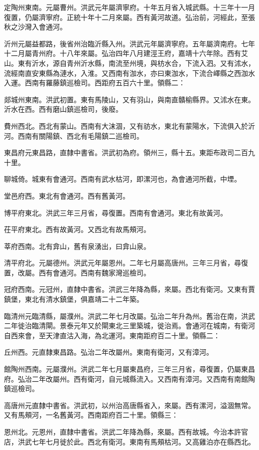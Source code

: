 定陶州東南。元屬曹州。洪武元年屬濟寧府。十年五月省入城武縣。十三年十一月復置，仍屬濟寧府。正統十年十二月來屬。西有黃河故道。弘治前，河經此，至張秋之沙灣入會通河。

沂州元屬益都路，後省州治臨沂縣入州。洪武元年屬濟寧府。五年屬濟南府。七年十二月屬青州府。十八年來屬。弘治四年八月建涇王府，嘉靖十六年除。西有艾山。東有沂水，源自青州沂水縣，南流至州境，與枋水合，下流入泗。又有沭水，流經南直安東縣為漣水，入淮。又西南有泇水，亦曰東泇水，下流合嶧縣之西泇水入運。西南有羅藤鎮巡檢司。西距府五百六十里。領縣二：

郯城州東南。洪武初置。東有馬陵山，又有羽山，與南直贛榆縣界。又沭水在東。沂水在西。西有磨山鎮巡檢司，後廢。

費州西北。西北有蒙山。西南有大沫涸，又有祊水，東北有蒙陽水，下流俱入於沂河。西南有關陽鎮、西北有毛陽鎮二巡檢司。

東昌府元東昌路，直隸中書省。洪武初為府。領州三，縣十五。東距布政司二百九十里。

聊城倚。城東有會通河。西南有武水枯河，即漯河也，為會通河所截，中堙。

堂邑府西。東北有會通河。西有舊黃河。

博平府東北。洪武三年三月省，尋復置。西南有會通河。東北有故黃河。

茌平府東北。西有故黃河。又西北有故馬頰河。

莘府西南。北有弇山，舊有泉湧出，曰弇山泉。

清平府北。元屬德州。洪武元年屬恩州。二年七月屬高唐州。三年三月省，尋復置，改屬。西有會通河。西南有魏家灣巡檢司。

冠府西南。元冠州，直隸中書省。洪武三年降為縣，來屬。西北有衛河。又東有賈鎮堡，東北有清水鎮堡，俱嘉靖二十二年築。

臨清州元臨清縣，屬濮州。洪武二年七月改屬。弘治二年升為州。舊治在南，洪武二年徙治臨清閘。景泰元年又於閘東北三里築城，徙治焉。會通河在城南，有衛河自西來會，至天津直沽入海，為北運河。東南距府百二十里。領縣二：

丘州西。元直隸東昌路。弘治二年改屬州。東南有衛河，又有漳河。

館陶州西南。元屬濮州。洪武二年七月屬東昌府，三年三月省，尋復置，仍屬東昌府。弘治二年改屬州。西有衛河，自元城縣流入。又西南有漳河。又西南有南館陶鎮巡檢司。

高唐州元直隸中書省。洪武初，以州治高唐縣省入，來屬。西有漯河，溢涸無常。又有馬頰河，一名舊黃河。西南距府百二十里。領縣三：

恩州北。元恩州，直隸中書省。洪武二年降為縣，來屬。西有故城。今治本許官店，洪武七年七月徙於此。西北有衛河。東南有馬頰枯河。又高雞泊亦在縣西北。

